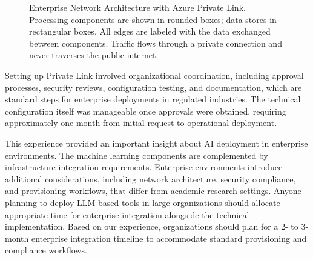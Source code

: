 \begin{figure}[htbp]
{
    }
    \caption{Enterprise Network Architecture with Azure Private Link. Processing components are shown in rounded boxes; data stores in rectangular boxes. All edges are labeled with the data exchanged between components. Traffic flows through a private connection and never traverses the public internet.}
    \label{fig:enterprise_network}
\end{figure}

Setting up Private Link involved organizational coordination, including approval processes, security reviews, configuration testing, and documentation, which are standard steps for enterprise deployments in regulated industries. The technical configuration itself was manageable once approvals were obtained, requiring approximately one month from initial request to operational deployment.

This experience provided an important insight about AI deployment in enterprise environments. The machine learning components are complemented by infrastructure integration requirements. Enterprise environments introduce additional considerations, including network architecture, security compliance, and provisioning workflows, that differ from academic research settings. Anyone planning to deploy LLM-based tools in large organizations should allocate appropriate time for enterprise integration alongside the technical implementation. Based on our experience, organizations should plan for a 2- to 3-month enterprise integration timeline to accommodate standard provisioning and compliance workflows.


